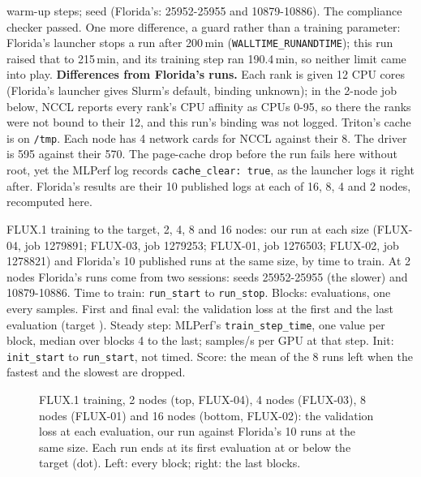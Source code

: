 \TriFxTwoWarmup{} warm-up steps; seed \TriFxTwoSeed{} (Florida's: 25952-25955 and 10879-10886). The compliance checker passed. One more difference, a guard rather than a training parameter: Florida's launcher stops a run after 200\,min (\texttt{WALLTIME\_RUNANDTIME}); this run raised that to 215\,min, and its training step ran 190.4\,min, so neither limit came into play. \textbf{Differences from Florida's runs.} Each rank is given 12 CPU cores (Florida's launcher gives Slurm's default, binding unknown); in the 2-node job below, NCCL reports every rank's CPU affinity as CPUs 0-95, so there the ranks were not bound to their 12, and this run's binding was not logged. Triton's cache is on \texttt{/tmp}. Each node has 4 network cards for NCCL against their 8. The driver is 595 against their 570. The page-cache drop before the run fails here without root, yet the MLPerf log records \texttt{cache\_clear: true}, as the launcher logs it right after. Florida's results are their 10 published logs at each of 16, 8, 4 and 2 nodes, recomputed here.

\begin{table}[h]
  \caption{FLUX.1 training to the target, 2, 4, 8 and 16 nodes: our run at each size (FLUX-04, job 1279891; FLUX-03, job 1279253; FLUX-01, job 1276503; FLUX-02, job 1278821) and Florida's 10 published runs at the same size, by time to train. At 2 nodes Florida's runs come from two sessions: seeds 25952-25955 (the slower) and 10879-10886. Time to train: \texttt{run\_start} to \texttt{run\_stop}. Blocks: evaluations, one every \TriFxBlockSamples{} samples. First and final eval: the validation loss at the first and the last evaluation (target \TriFxTarget). Steady step: MLPerf's \texttt{train\_step\_time}, one value per block, median over blocks 4 to the last; samples/s per GPU at that step. Init: \texttt{init\_start} to \texttt{run\_start}, not timed. Score: the mean of the 8 runs left when the fastest and the slowest are dropped.}
  \label{tab:flux_runs}
  \centering\small
  \begin{adjustbox}{max width=\linewidth}
  \end{adjustbox}
\end{table}

\begin{figure}[h]
  \centering{}
  \caption{FLUX.1 training, 2 nodes (top, FLUX-04), 4 nodes (FLUX-03), 8 nodes (FLUX-01) and 16 nodes (bottom, FLUX-02): the validation loss at each evaluation, our run against Florida's 10 runs at the same size. Each run ends at its first evaluation at or below the target (dot). Left: every block; right: the last blocks.}
  \label{fig:flux}
\end{figure}

